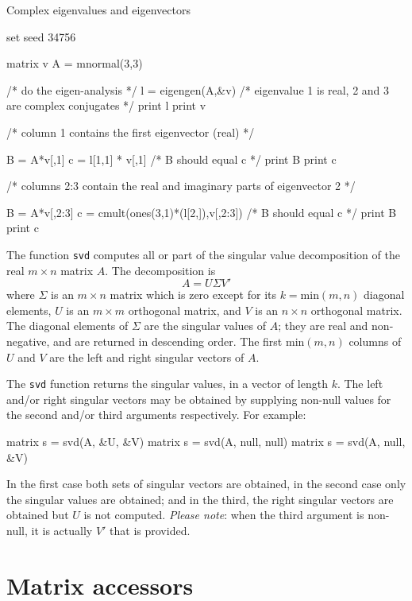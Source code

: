 \begin{script}[htbp]
  \caption{Complex eigenvalues and eigenvectors}
  \label{cmplx-evecs}
\begin{scode}
set seed 34756

matrix v
A = mnormal(3,3)

/* do the eigen-analysis */
l = eigengen(A,&v)
/* eigenvalue 1 is real, 2 and 3 are complex conjugates */
print l
print v

/* 
  column 1 contains the first eigenvector (real)
*/

B = A*v[,1]
c = l[1,1] * v[,1]
/* B should equal c */
print B
print c


/* 
  columns 2:3 contain the real and imaginary parts
  of eigenvector 2
*/

B = A*v[,2:3]
c = cmult(ones(3,1)*(l[2,]),v[,2:3])
/* B should equal c */
print B
print c
\end{scode}
\end{script}

The function \texttt{svd} computes all or part of the singular value
decomposition of the real $m \times n$ matrix $A$.  The decomposition
is
\[
A = U \Sigma V'
\]
where $\Sigma$ is an $m \times n$ matrix which is zero except for its
$k = \mbox{min}(m, n)$ diagonal elements, $U$ is an $m \times m$
orthogonal matrix, and $V$ is an $n \times n$ orthogonal matrix.  The
diagonal elements of $\Sigma$ are the singular values of $A$; they are
real and non-negative, and are returned in descending order.  The
first $\mbox{min}(m, n)$ columns of $U$ and $V$ are the left and right
singular vectors of $A$.

The \texttt{svd} function returns the singular values, in a vector of
length $k$.  The left and/or right singular vectors may be obtained by
supplying non-null values for the second and/or third arguments
respectively.  For example:
%
\begin{code}
matrix s = svd(A, &U, &V)
matrix s = svd(A, null, null)
matrix s = svd(A, null, &V)
\end{code}
%
In the first case both sets of singular vectors are obtained, in the
second case only the singular values are obtained; and in the third,
the right singular vectors are obtained but $U$ is not computed.
\emph{Please note}: when the third argument is non-null, it is
actually $V'$ that is provided.


\section{Matrix accessors}
\label{matrix-accessors}

